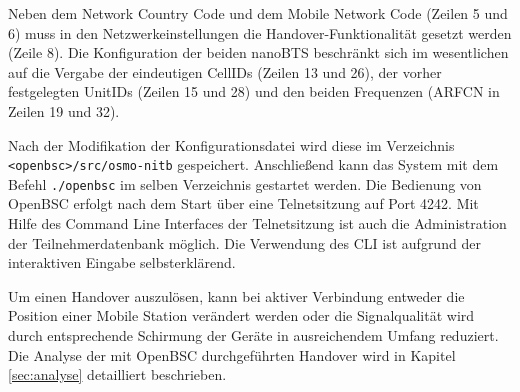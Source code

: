 Neben dem Network Country Code und dem Mobile Network Code (Zeilen 5 und 6) muss in den Netzwerkeinstellungen die Handover-Funktionalität gesetzt werden (Zeile 8). Die Konfiguration der beiden nanoBTS beschränkt sich im wesentlichen auf die Vergabe der eindeutigen CellIDs (Zeilen 13 und 26), der vorher festgelegten UnitIDs (Zeilen 15 und 28) und den beiden Frequenzen (ARFCN in Zeilen 19 und 32).

Nach der Modifikation der Konfigurationsdatei wird diese im Verzeichnis \lstinline{<openbsc>/src/osmo-nitb} gespeichert. Anschließend kann das System mit dem Befehl \lstinline{./openbsc} im selben Verzeichnis gestartet werden. Die Bedienung von OpenBSC erfolgt nach dem Start über eine Telnetsitzung auf Port 4242. Mit Hilfe des Command Line Interfaces der Telnetsitzung ist auch die Administration der Teilnehmerdatenbank möglich. Die Verwendung des CLI ist aufgrund der interaktiven Eingabe selbsterklärend.

Um einen Handover auszulösen, kann bei aktiver Verbindung entweder die Position einer Mobile Station verändert werden oder die Signalqualität wird durch entsprechende Schirmung der Geräte in ausreichendem Umfang reduziert. Die Analyse der mit OpenBSC durchgeführten Handover wird in Kapitel \ref{sec:analyse} detailliert beschrieben.
